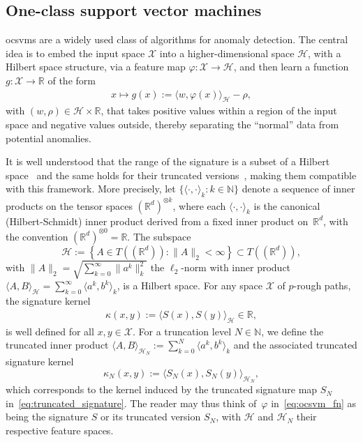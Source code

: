 \documentclass[twoside,11pt]{article}
\numberwithin{equation}{section}
\numberwithin{theorem}{section}
\newcommand{\R}{\mathbb{R}}
\newcommand{\X}{\mathcal{X}}
\newcommand{\h}{\mathcal{H}}
\newcommand{\statespace}{\mathbb{R}^d}
\newcommand{\tensora}{A}
\newcommand{\rkhsnorm}[1]{\|#1\|_{2}}
\begin{document}
\subsection{One-class support vector machines}
\Glspl{ocsvm} are a widely used class of algorithms for anomaly detection. The central idea is to embed the input space $\X$ into a higher-dimensional space $\h$, with a Hilbert space structure, via a feature map $\varphi:\X\to \h$, and then learn a function $g:\mathcal{X}\to \mathbb{R}$ of the form 
\begin{align}\label{eq:ocsvm_fn}
    x\longmapsto g(x):= \langle w, \varphi(x)\rangle_{\h} -\rho, 
\end{align}
with $(w,\rho)\in \h\times \R$, that takes positive values within a region of the input space and negative values outside, thereby separating the “normal” data from potential anomalies. 

It is well understood that the range of the signature is a subset of a Hilbert space~\citep{salvi2021signature} and the same holds for their truncated versions~\citep{kiraly2019kernels}, making them compatible with this framework. More precisely, let $\{\langle \cdot, \cdot \rangle_{k}:k\in \mathbb N\}$ denote a sequence of inner products on the tensor spaces $(\statespace)^{\otimes k}$, where each $\langle \cdot,\cdot \rangle_k$ is the canonical (Hilbert-Schmidt) inner product derived from a fixed inner product on~$\statespace$, with the convention $(\statespace)^{\otimes 0}=\R$. The subspace  
\begin{equation}\label{eq:SigRKHS}
\h := \left\{  \tensora\in T((\statespace)) : \| \tensora \|_2 < \infty\right\}\subset T((\statespace)),
\end{equation}
with  $\rkhsnorm{\tensora} = \sqrt{\sum_{k=0}^\infty\|a^k\|^2_{k}}$
the $\ell_2$-norm with inner product $\langle A, B\rangle_{\h} =  \sum_{k=0}^{\infty}\langle a^k, b^k\rangle_{k}$, is a Hilbert space. 
For any space $\X$ of $p$-rough paths, the signature kernel \begin{align*}
\kappa(x,y) := \langle S(x), S(y)\rangle_\h\in\R,
\end{align*}
is well defined for all $x,y\in\X$. 
For a truncation level $N\in\mathbb{N}$, we define the truncated inner product $\langle A, B\rangle_{\h_N} := \sum_{k=0}^{N}\langle a^k, b^k\rangle_{k}$ and the associated truncated signature kernel
\begin{equation}\label{eq:truncated_signature_kernel}
\kappa_N(x,y) := \langle S_N(x), S_N(y)\rangle_{\h_N}, 
\end{equation}
which corresponds to the kernel induced by the truncated signature map $S_N$ in~\eqref{eq:truncated_signature}.
The reader may thus think of~$\varphi$ in~\eqref{eq:ocsvm_fn} as being the signature $S$ or its truncated version $S_N$, with $\h$ and $\h_N$ their respective feature spaces.
\end{document}

